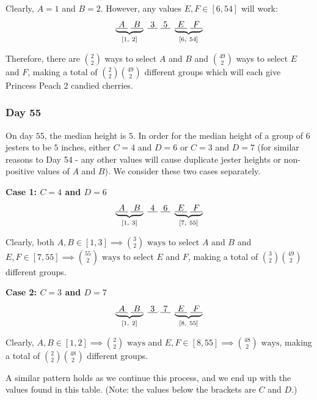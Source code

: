 \documentclass[12pt]{article}
\begin{document}
\begin{solution}{4}
    Clearly, $A=1$ and $B=2$. However, any values $E,F \in [6, 54]$ will work:
    \begin{equation*}
        \jester 35126{54}
    \end{equation*}

    Therefore, there are $\binom22$ ways to select $A$ and $B$ and $\binom{49}2$ ways to select $E$ and $F$,
    making a total of $\binom22\binom{49}2$ different groups which will each give Princess Peach 2 candied cherries.

    \subsubsection*{Day 55}

    On day $55$, the median height is $5$. In order for the median height of a group of 6 jesters to be $5$ inches,
    either $C=4$ and $D=6$ or $C=3$ and $D=7$ (for similar reasons to Day 54 - any other values will cause
    duplicate jester heights or non-positive values of $A$ and $B$). We consider these two cases separately.

    \textbf{Case 1: $C=4$ and $D=6$}
    \begin{equation*}
        \jester 46137{55}
    \end{equation*}

    Clearly, both $A,B\in[1,3] \implies \binom32\text{ ways}$ to select $A$ and $B$ and $E,F\in[7,55] \implies
    \binom{55}2\text{ ways}$ to select $E$ and $F$, making a total of $\binom32\binom{49}2$ different groups.

    \textbf{Case 2: $C=3$ and $D=7$}
    \begin{equation*}
        \jester 37128{55}
    \end{equation*}

    Clearly, $A,B\in[1,2] \implies \binom22\text{ ways}$ and $E,F\in[8,55]\implies\binom{48}2\text{ ways}$,
    making a total of $\binom22\binom{48}2$ different groups.

    A similar pattern holds as we continue this process, and we end up with the values found in this table.
    (Note: the values below the brackets are $C$ and $D$.) 


\end{solution}
\end{document}
